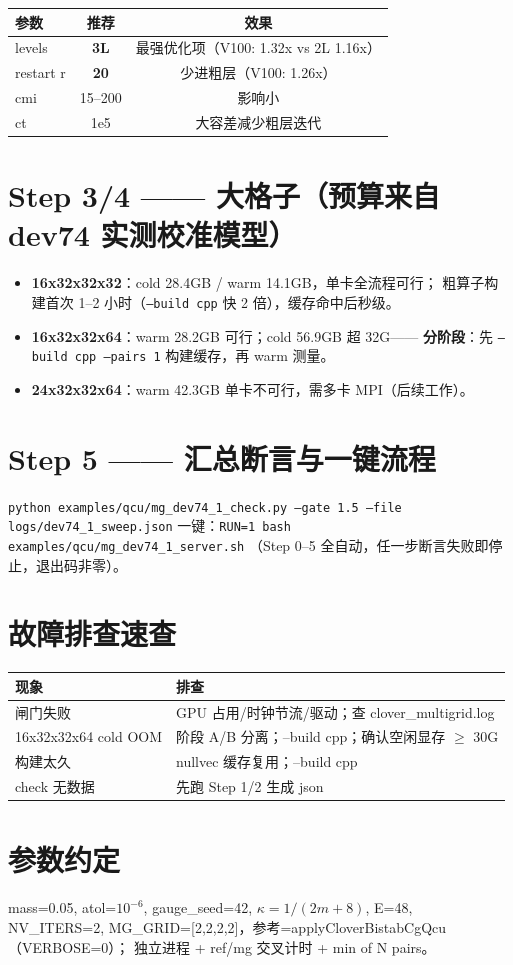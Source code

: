 \documentclass[11pt,a4paper]{article}
\begin{document}
\begin{center}
\begin{tabular}{lcc}
\hline
参数 & 推荐 & 效果 \\
\hline
levels & \textbf{3L} & 最强优化项（V100: 1.32x vs 2L 1.16x） \\
restart r & \textbf{20} & 少进粗层（V100: 1.26x） \\
cmi & 15--200 & 影响小 \\
ct & 1e5 & 大容差减少粗层迭代 \\
\hline
\end{tabular}
\end{center}

\section{Step 3/4 —— 大格子（预算来自 dev74 实测校准模型）}
\begin{itemize}
  \item \textbf{16x32x32x32}：cold 28.4GB / warm 14.1GB，单卡全流程可行；
    粗算子构建首次 1--2 小时（\texttt{--build cpp} 快 2 倍），缓存命中后秒级。
  \item \textbf{16x32x32x64}：warm 28.2GB 可行；cold 56.9GB 超 32G——
    \textbf{分阶段}：先 \texttt{--build cpp --pairs 1} 构建缓存，再 warm 测量。
  \item \textbf{24x32x32x64}：warm 42.3GB 单卡不可行，需多卡 MPI（后续工作）。
\end{itemize}

\section{Step 5 —— 汇总断言与一键流程}
\texttt{python examples/qcu/mg\_dev74\_1\_check.py --gate 1.5 --file logs/dev74\_1\_sweep.json}
一键：\texttt{RUN=1 bash examples/qcu/mg\_dev74\_1\_server.sh}
（Step 0--5 全自动，任一步断言失败即停止，退出码非零）。

\section{故障排查速查}
\begin{center}
\begin{tabular}{ll}
\hline
现象 & 排查 \\
\hline
闸门失败 & GPU 占用/时钟节流/驱动；查 clover\_multigrid.log \\
16x32x32x64 cold OOM & 阶段 A/B 分离；--build cpp；确认空闲显存 $\ge$ 30G \\
构建太久 & nullvec 缓存复用；--build cpp \\
check 无数据 & 先跑 Step 1/2 生成 json \\
\hline
\end{tabular}
\end{center}

\section{参数约定}
mass=0.05, atol=$10^{-6}$, gauge\_seed=42, $\kappa=1/(2m+8)$, E=48,
NV\_ITERS=2, MG\_GRID=[2,2,2,2]，参考=applyCloverBistabCgQcu（VERBOSE=0）；
独立进程 + ref/mg 交叉计时 + min of N pairs。
\end{document}
